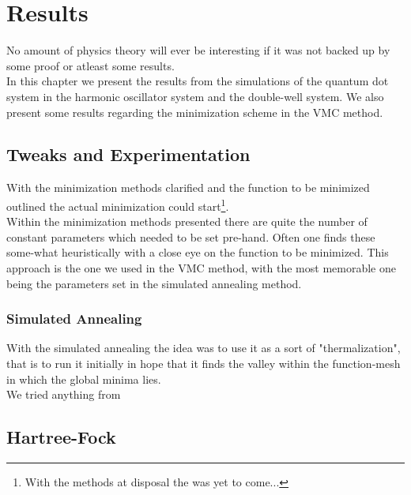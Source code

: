 \chapter{Results \label{chapter:6}}
    No amount of physics theory will ever be interesting if it was not backed
    up by some proof or atleast some results. \\
    In this chapter we present the results from the simulations of the quantum
    dot system in the harmonic oscillator system and the double-well system. We
    also present some results regarding the minimization scheme in the VMC
    method.

\section{Tweaks and Experimentation}
    With the minimization methods clarified and the function to be minimized
    outlined the actual minimization could start\footnote{With the methods at
    disposal the  was yet to come...}. \\
    Within the minimization methods presented there are quite the number of
    constant parameters which needed to be set pre-hand. Often one finds these
    some-what heuristically with a close eye on the function to be minimized.
    This approach is the one we used in the VMC method, with the most memorable
    one being the parameters set in the simulated annealing method.

\subsection{Simulated Annealing}
    With the simulated annealing the idea was to use it as a sort of
    "thermalization", that is to run it initially in hope that it finds the
    valley within the function-mesh in which the global minima lies. \\
    We tried anything from 

\section{Hartree-Fock}
    
    

